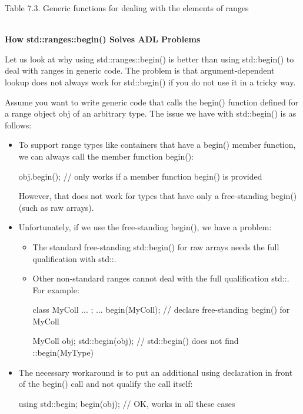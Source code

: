\begin{table}[H]
\begin{tabular}{|l|l|}
\end{tabular}
\end{table}

\begin{center}
Table 7.3. Generic functions for dealing with the elements of ranges
\end{center}

\noindent
\hspace*{\fill} \\ %
\textbf{How std::ranges::begin() Solves ADL Problems}

Let us look at why using std::ranges::begin() is better than using std::begin() to deal with ranges in generic code. The problem is that argument-dependent lookup does not always work for std::begin() if you do not use it in a tricky way.

Assume you want to write generic code that calls the begin() function defined for a range object obj of an arbitrary type. The issue we have with std::begin() is as follows:

\begin{itemize}
\item
To support range types like containers that have a begin() member function, we can always call the member function begin():

\begin{cpp}
obj.begin(); // only works if a member function begin() is provided
\end{cpp}

However, that does not work for types that have only a free-standing begin() (such as raw arrays).

\item
Unfortunately, if we use the free-standing begin(), we have a problem:

\begin{itemize}
\item
The standard free-standing std::begin() for raw arrays needs the full qualification with std::.

\item
Other non-standard ranges cannot deal with the full qualification std::. For example:

\begin{cpp}
class MyColl {
	...
};
... begin(MyColl); // declare free-standing begin() for MyColl

MyColl obj;
std::begin(obj); // std::begin() does not find ::begin(MyType)
\end{cpp}
\end{itemize}

\item
The necessary workaround is to put an additional using declaration in front of the begin() call and not qualify the call itself:

\begin{cpp}
using std::begin;
begin(obj); // OK, works in all these cases
\end{cpp}
\end{itemize}

